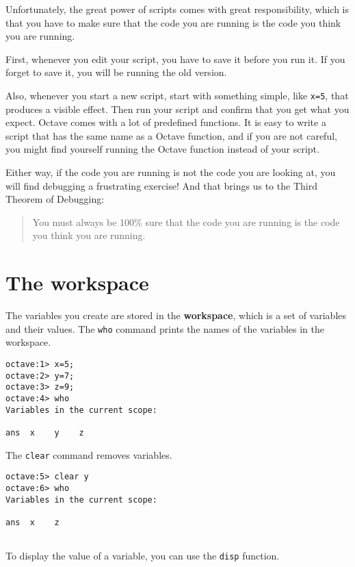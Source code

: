 Unfortunately, the great power of scripts comes with great responsibility,
which is that you have to make sure that the code you are running is
the code you think you are running.

First, whenever you edit your script, you have to save it before you
run it. If you forget to save it, you will be running the old version.

Also, whenever you start a new script, start with something simple,
like {\tt x=5}, that produces a visible effect. Then run your script
and confirm that you get what you expect. Octave comes with a lot of
predefined functions. It is easy to write a script that has the same
name as a Octave function, and if you are not careful, you might
find yourself running the Octave function instead of your script.

Either way, if the code you are running is not the code you are looking
at, you will find debugging a frustrating exercise! And that brings
us to the Third Theorem of Debugging:

\begin{quote}
You must always be 100\% sure that the code you are running is
the code you think you are running.
\end{quote}



\section{The workspace}

The variables you create are stored in the {\bf workspace}, which is a
set of variables and their values. The {\tt who} command prints the
names of the variables in the workspace.

\begin{verbatim}
octave:1> x=5;
octave:2> y=7;
octave:3> z=9;
octave:4> who
Variables in the current scope:

ans  x    y    z

\end{verbatim}

The {\tt clear} command removes variables.

\begin{verbatim}
octave:5> clear y
octave:6> who
Variables in the current scope:

ans  x    z


\end{verbatim}

To display the value of a variable, you can use the {\tt disp}
function.

